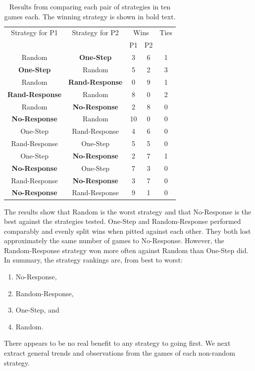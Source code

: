 \documentclass{sig-alternate-05-2015}
\newcommand{\highlightrow}{}  %
\begin{document}
\begin{table}[h!tb]
\begin{center}
\begin{tabular}{|c|c|c|c|c|} \hline
\highlightrow
 Strategy for P1 & Strategy for P2 & \multicolumn{2}{c|}{Wins} & Ties \\ \cline{3-4}
\highlightrow & & P1 & P2 & \\ \hline
Random & {\bf One-Step} & 3 & 6 & 1 \\
{\bf One-Step} & Random &5 & 2 & 3 \\
Random & {\bf Rand-Response} & 0 & 9 & 1 \\
{\bf Rand-Response} & Random & 8 & 0 & 2 \\
Random & {\bf No-Response} & 2 & 8 & 0 \\
{\bf No-Response} & Random & 10 & 0 & 0 \\
One-Step & Rand-Response & 4 & 6 & 0 \\
Rand-Response & One-Step & 5 & 5 & 0 \\
One-Step & {\bf No-Response} & 2 & 7 & 1 \\
{\bf No-Response} & One-Step & 7 & 3 & 0 \\
Rand-Response & {\bf No-Response} &  3 & 7 & 0 \\
{\bf No-Response} & Rand-Response & 9 & 1 & 0 \\
\hline
\end{tabular}
\caption{Results from comparing each pair of strategies in ten games each. The winning strategy is shown in bold text.\label{tab:results}}
\end{center}
\end{table}

The results show that Random is the worst strategy and that No-Response is the best against the strategies tested. 
One-Step and Random-Response performed comparably and evenly split wins when pitted against each other. They both lost approximately the same number of games to No-Response. 
However, the Random-Response strategy won more often against Random than One-Step did.
In summary, the strategy rankings are, from best to worst:
\begin{enumerate}
\item No-Response, 
\item Random-Response, 
\item One-Step, and 
\item Random.
\end{enumerate}
There appears to be no real benefit to any strategy to going first.
We next extract general trends and observations from the games of each non-random strategy.
\end{document}
